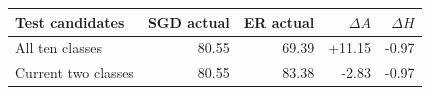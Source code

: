 \begin{tabular}{lrrrr}
\toprule
Test candidates & SGD actual & ER actual & $\Delta A$ & $\Delta H$ \\
\midrule
All ten classes & 80.55 & 69.39 & +11.15 & -0.97 \\
Current two classes & 80.55 & 83.38 & -2.83 & -0.97 \\
\bottomrule
\end{tabular}
